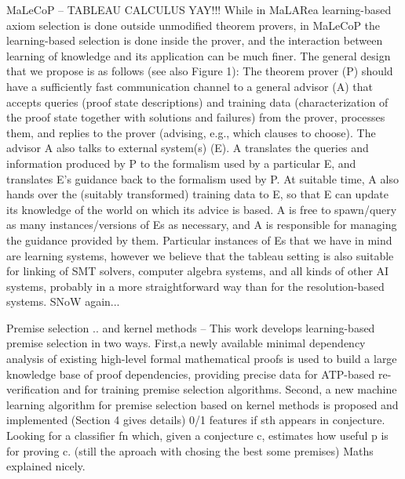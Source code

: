 \documentclass{article}
\begin{document}
MaLeCoP \cite{malecop} -- TABLEAU CALCULUS YAY!!! While in MaLARea
learning-based axiom selection is done outside unmodified theorem provers, in
MaLeCoP the learning-based selection is done inside the prover, and the
interaction between learning of knowledge and its application can be much
finer. The general design that we propose is as follows (see also Figure 1):
The theorem prover (P) should have a sufficiently fast communication channel to
a general advisor (A) that accepts queries (proof state descriptions) and
training data (characterization of the proof state together with solutions
and failures) from the prover, processes them, and replies to the prover
(advising, e.g., which clauses to choose). The advisor A also talks to external
system(s) (E). A translates the queries and information produced by P to the
formalism used by a particular E, and translates E’s guidance back to the
formalism used by P. At suitable time, A also hands over the (suitably
transformed) training data to E, so that E can update its knowledge of the
world on which its advice is based. A is free to spawn/query as many
instances/versions of Es as necessary, and A is responsible for managing the
guidance provided by them. Particular instances of Es that we have in mind are
learning systems, however we believe that the tableau setting is also suitable
for linking of SMT solvers, computer algebra systems, and all kinds of other AI
systems, probably in a more straightforward way than for the resolution-based
systems. SNoW again...

Premise selection .. and kernel methods \cite{PremiseSelection} -- This  work
develops  learning-based  premise  selection  in  two  ways.  First,a  newly
available  minimal dependency  analysis  of  existing  high-level  formal
mathematical proofs is used to build a large knowledge base of proof
dependencies,  providing  precise  data  for  ATP-based  re-verification  and
for  training premise selection algorithms.  Second, a new machine learning
algorithm for premise selection based on kernel methods is proposed and
implemented (Section 4 gives details) 0/1 features if sth appears in
conjecture. Looking for a classifier fn which, given a conjecture c, estimates
how useful p is for proving c. (still the aproach with chosing the best some
premises) Maths explained nicely.
\end{document}
